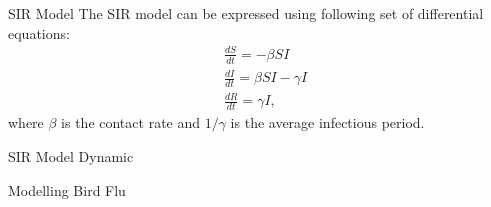 \documentclass{beamer}
\begin{document}
\begin{frame}{SIR Model}
The SIR model can be expressed using following set of differential equations:
\begin{align*}
&\frac{dS}{dt} = - \beta S I\\
&\frac{dI}{dt} = \beta S I - \gamma I \\
&\frac{dR}{dt} = \gamma I,
\end{align*}
where $\beta$ is the contact rate and $1/\gamma$ is the average infectious period.
\end{frame}


\begin{frame}{SIR Model Dynamic}

\end{frame}

\begin{frame}{Modelling Bird Flu}
\end{frame}
\end{document}

